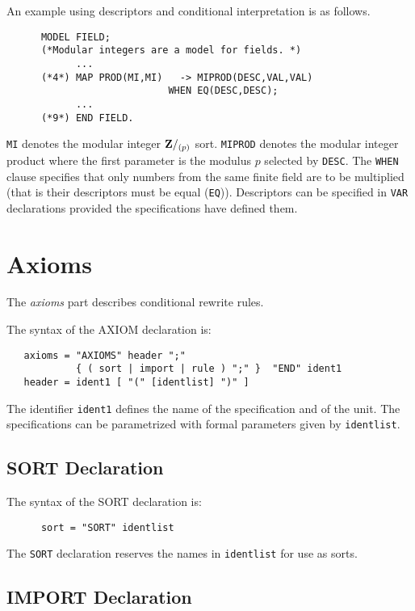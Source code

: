An example using descriptors and conditional interpretation 
is as follows.
\begin{verbatim}
      MODEL FIELD;
      (*Modular integers are a model for fields. *)
            ...
      (*4*) MAP PROD(MI,MI)   -> MIPROD(DESC,VAL,VAL) 
                            WHEN EQ(DESC,DESC);
            ...
      (*9*) END FIELD.
\end{verbatim}
\verb/MI/ denotes the modular integer ${\bf Z}/_{(p)}$ sort. 
\verb/MIPROD/ denotes the modular integer product where the 
first parameter is the modulus $p$ selected by \verb/DESC/. 
The \verb/WHEN/ clause specifies that 
only numbers from the same finite field are to be multiplied
(that is their descriptors must be equal (\verb/EQ/)).  
Descriptors can be specified in \verb/VAR/ declarations 
provided the specifications have defined them.


\section{Axioms}

The {\em axioms} part describes conditional rewrite rules. 

The syntax of the AXIOM declaration is:
\begin{verbatim}
   axioms = "AXIOMS" header ";" 
            { ( sort | import | rule ) ";" }  "END" ident1
   header = ident1 [ "(" [identlist] ")" ]
\end{verbatim}
The identifier \verb/ident1/ defines the name 
of the specification and of the unit.
The specifications can be parametrized 
with formal parameters given by \verb/identlist/.  

\subsection{SORT Declaration}

The syntax of the SORT declaration is:
\begin{verbatim}
      sort = "SORT" identlist   
\end{verbatim}
The \verb/SORT/ declaration reserves the names 
in \verb/identlist/ for use as sorts.

\subsection{IMPORT Declaration}

